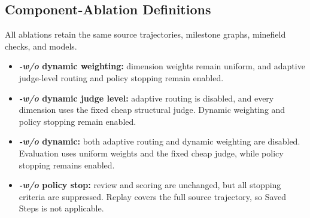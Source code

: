 \subsection{Component-Ablation Definitions}
\label{app:ablation_details}

All ablations retain the same source trajectories, milestone graphs, minefield checks, and models.

\begin{itemize}[leftmargin=*,itemsep=1.5pt,topsep=2pt]
    \item \textbf{\textit{-w/o} dynamic weighting:} dimension weights remain uniform, and adaptive judge-level routing and policy stopping remain enabled.
    \item \textbf{\textit{-w/o} dynamic judge level:} adaptive routing is disabled, and every dimension uses the fixed cheap structural judge. Dynamic weighting and policy stopping remain enabled.
    \item \textbf{\textit{-w/o} dynamic:} both adaptive routing and dynamic weighting are disabled. Evaluation uses uniform weights and the fixed cheap judge, while policy stopping remains enabled.
    \item \textbf{\textit{-w/o} policy stop:} review and scoring are unchanged, but all stopping criteria are suppressed. Replay covers the full source trajectory, so Saved Steps is not applicable.
\end{itemize}
